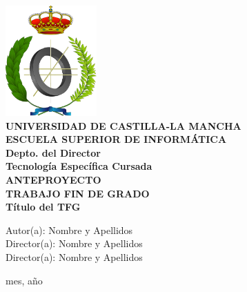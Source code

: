 \documentclass[11pt,a4paper,twoside,final]{article}
\begin{document}




\begin{titlepage}
	\begin{center}
	\includegraphics[width=3.5cm]{escudoInf}\\[1.5cm]
	 
	{\LARGE \textbf{UNIVERSIDAD DE CASTILLA-LA MANCHA \\[0.5em]
	ESCUELA SUPERIOR DE INFORMÁTICA}}\\[0.5cm]
	{\Large \textbf{Depto. del Director}}\\[0.5cm]
	{\large \textbf{Tecnología Específica Cursada}}\\[1.5cm]
	{\LARGE \textbf{ANTEPROYECTO \\[0.5em]
	TRABAJO FIN DE GRADO}}\\[1cm]
	
	{\LARGE \textbf{Título del TFG}}\\[3cm]
	\end{center}
	
	\begin{flushleft}
		{\Large Autor(a): Nombre y Apellidos} \\[1em]
		{\Large Director(a): Nombre y Apellidos} \\[1em]
		{\Large Director(a): Nombre y Apellidos} %
	\end{flushleft}
	\vfill%
	
	\begin{flushright}
		{\Large mes, año}
	\end{flushright}
\end{titlepage}






\tableofcontents  %

\renewcommand{\tablename}{Tabla} %
\end{document}
